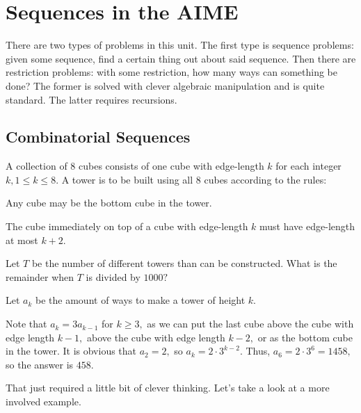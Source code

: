 \documentclass[blue,onecol]{shooting}
\begin{document}



\chapter{Sequences in the AIME}











There are two types of problems in this unit. The first type is sequence problems: given some sequence, find a certain thing out about said sequence. Then there are restriction problems: with some restriction, how many ways can something be done? The former is solved with clever algebraic manipulation and is quite standard. The latter requires recursions.

\section{Combinatorial Sequences}

\begin{exam}[AIME I 2006/11]
A collection of $8$ cubes consists of one cube with edge-length $k$ for each integer $k, 1 \le k \le 8.$ A tower is to be built using all $8$ cubes according to the rules:

\begin{itemize}

    \Item Any cube may be the bottom cube in the tower.

    \Item The cube immediately on top of a cube with edge-length $k$ must have edge-length at most $k+2.$

\end{itemize}

Let $T$ be the number of different towers than can be constructed. What is the remainder when $T$ is divided by $1000?$
\end{exam}
\begin{sol}
Let $a_k$ be the amount of ways to make a tower of height $k.$
    
Note that $a_k=3a_{k-1}$ for $k\geq 3,$ as we can put the last cube above the cube with edge length $k-1,$ above the cube with edge length $k-2,$ or as the bottom cube in the tower. It is obvious that $a_2=2,$ so $a_k=2\cdot 3^{k-2}.$ Thus, $a_6=2\cdot 3^6=1458,$ so the answer is $458.$
\end{sol}
That just required a little bit of clever thinking. Let's take a look at a more involved example.
\end{document}
